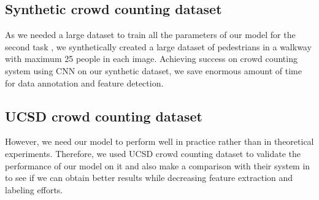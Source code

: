 \subsection{Synthetic crowd counting dataset}

As we needed a large dataset to train all the parameters of our model for the second task , we synthetically created a large dataset of pedestrians in a walkway with maximum 25 people in each image. Achieving success on crowd counting system using CNN on our synthetic dataset, we save enormous amount of time for data annotation and feature detection. 

\subsection{UCSD crowd counting dataset}

However, we need our model to perform well in practice rather than in theoretical experiments. Therefore, we used UCSD crowd counting dataset \cite{chan2008privacy} to validate the performance of our model on it and also make a comparison with their system in \cite{chan2008privacy} to see if we can obtain better results while decreasing feature extraction and labeling efforts. 




